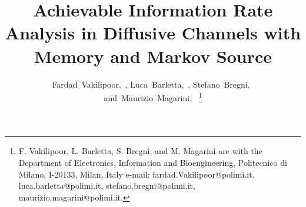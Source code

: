 \documentclass[journal]{IEEEtranTCOM}
\begin{document}


\title{Achievable Information Rate Analysis in Diffusive Channels with Memory and Markov Source}

%
%
%
\author{Fardad~Vakilipoor,~,
Luca~Barletta,~, Stefano~Bregni,~ and~Maurizio~Magarini,~%
\thanks{F. Vakilipoor, L. Barletta, S. Bregni, and M. Magarini are with the Department of Electronics, Information and Bioengineering, Politecnico di Milano, I-20133, Milan, Italy e-mail: fardad.Vakilipoor@polimi.it,
luca.barletta@polimi.it,
stefano.bregni@polimi.it,
maurizio.magarini@polimi.it.}%
}

\end{document}
